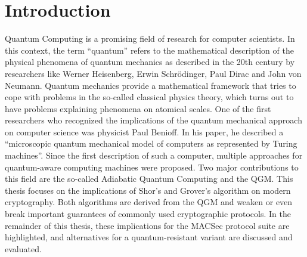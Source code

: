 \chapter{Introduction}

Quantum Computing is a promising field of research for computer scientists. In this context, the term ``quantum'' refers to the mathematical description of the physical phenomena of quantum mechanics as described in the 20th century by researchers like Werner Heisenberg, Erwin Schrödinger, Paul Dirac and John von Neumann. Quantum mechanics provide a mathematical framework that tries to cope with problems in the so-called classical physics theory, which turns out to have problems explaining phenomena on atomical scales. One of the first researchers who recognized the implications of the quantum mechanical approach on computer science was physicist Paul Benioff. In his paper, he described a ``microscopic quantum mechanical model of computers as represented by Turing machines''\cite{benioff1980computer}. Since the first description of such a computer, multiple approaches for quantum-aware computing machines were proposed. Two major contributions to this field are the so-called Adiabatic Quantum Computing and the \ac{QGM}. This thesis focuses on the implications of Shor's and Grover's algorithm on modern cryptography. Both algorithms are derived from the \ac{QGM} and weaken or even break important guarantees of commonly used cryptographic protocols. In the remainder of this thesis, these implications for the MACSec protocol suite are highlighted, and alternatives for a quantum-resistant variant are discussed and evaluated.

